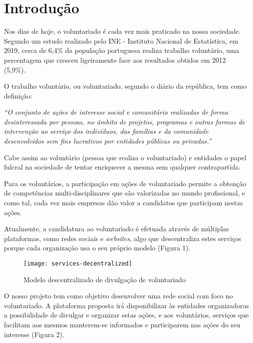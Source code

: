 \section{Introdução} \bigskip
Nos dias de hoje, o voluntariado é cada vez mais praticado na nossa sociedade. Segundo um estudo realizado pelo INE - Instituto Nacional de Estatística, em 2019, cerca de 6,4\% da população portuguesa realiza trabalho voluntário, uma percentagem que cresceu ligeiramente face aos resultados obtidos em 2012 (5,9\%).~\cite{estatistica_2019}
\par \bigskip

O trabalho voluntário, ou voluntariado, segundo o diário da república, tem como definição: \par \bigskip

\textit{
	``O conjunto de ações de interesse social e comunitário realizadas de forma desinteressada por pessoas, no âmbito de projetos, programas e outras formas de intervenção ao serviço dos indivíduos, das famílias e da comunidade desenvolvidos sem fins lucrativos por entidades públicas ou privadas.''~\cite{decreto_lei_71/98}
}\par \bigskip

Cabe assim ao voluntário (pessoa que realiza o voluntariado) e entidades o papel fulcral na sociedade de tentar enriquecer a mesma sem qualquer contrapartida. \par \bigskip

Para os voluntários, a participação em ações de voluntariado permite a obtenção de competências multi-disciplinares que são valorizadas no mundo profissional, e como tal, cada vez mais empresas dão valor a candidatos que participam nestas ações. \par \bigskip

Atualmente, a candidatura ao voluntariado é efetuada através de múltiplas plataformas, como redes sociais e \textit{websites}, algo que descentraliza estes serviços porque cada organização usa o seu próprio modelo (Figura 1).

\bigskip

\begin{figure}[h]
	\centering
	\texttt{[image: services-decentralized]}
	\caption{Modelo descentralizado de divulgação de voluntariado}	
\end{figure}

\newpage

O nosso projeto tem como objetivo desenvolver uma rede social  com foco no voluntariado. A plataforma proposta irá disponibilizar às entidades organizadoras a possibilidade de divulgar e organizar estas ações, e aos voluntários, serviços que facilitam aos mesmos manterem-se informados e participarem nas ações do seu interesse (Figura 2).

